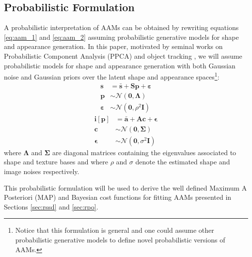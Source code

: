 \subsection{Probabilistic Formulation}
\label{sec:probabilistic_aam}

A probabilistic interpretation of AAMs can be obtained by rewriting equations \ref{eq:aam_1} and \ref{eq:aam_2} assuming probabilistic generative models for shape and appearance generation. In this paper, motivated by seminal works on Probabilistic Component Analysis (PPCA) and object tracking \cite{Tipping1999, Roweis1998, Moghaddam1997}, we will assume probabilistic models for shape and appearance generation with both Gaussian noise and Gaussian priors over the latent shape and appearance spaces\footnote{Notice that this formulation is general and one could assume other probabilistic generative models \cite{vanderMaaten2010, Bach2005, Prince2012, Nicolau2014} to define novel probabilistic versions of AAMs.}:
\begin{equation}
	\begin{aligned}
		\mathbf{s} & = \bar{\mathbf{s}} + \mathbf{S} \mathbf{p} + \boldsymbol{\varepsilon}
		\\
		\mathbf{p} & \sim \mathcal{N} \left( \mathbf{0}, \mathbf{\Lambda} \right) 
		\\
		\boldsymbol{\varepsilon} & \sim \mathcal{N} \left( \mathbf{0}, \rho^2 \mathbf{I} \right) 
	\end{aligned}
\end{equation}
\begin{equation}
	\begin{aligned}
		\mathbf{i}[\mathbf{p}] & = \bar{\mathbf{a}} + \mathbf{A} \mathbf{c} + \boldsymbol{\epsilon}
		\\
		\mathbf{c} & \sim \mathcal{N} \left( \mathbf{0}, \mathbf{\Sigma} \right) 
		\\
		\boldsymbol{\epsilon} & \sim \mathcal{N} \left( \mathbf{0}, \sigma^2 \mathbf{I} \right) 
	\end{aligned}
\end{equation}
where $\mathbf{\Lambda}$ and $\mathbf{\Sigma}$ are diagonal matrices containing the eigenvalues associated to shape and texture bases and where $\rho$ and $\sigma$ denote the estimated shape and image noises respectively.

This probabilistic formulation will be used to derive the well defined Maximum A Posteriori (MAP) and Bayesian cost functions for fitting AAMs presented in Sections \ref{sec:rssd} and \ref{sec:rpo}.

